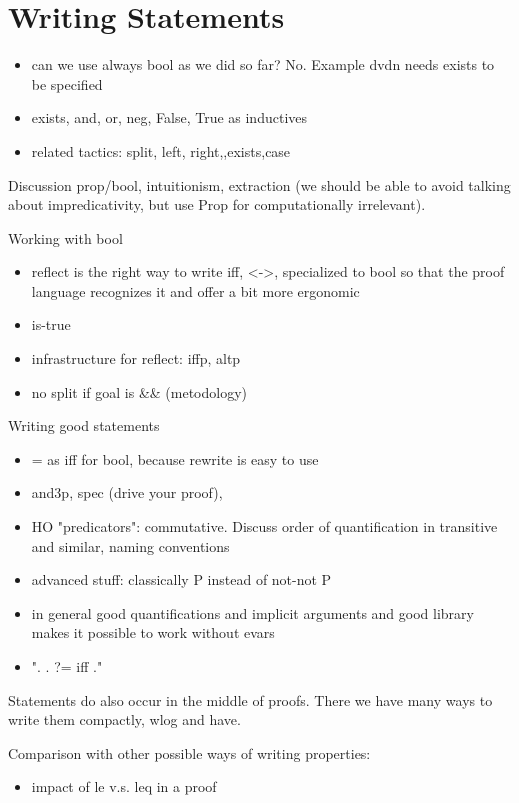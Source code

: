 \chapter{Writing Statements}

% 

\begin{itemize}
\item can we use always bool as we did so far? No. Example dvdn needs exists
        to be specified
\item exists, and, or, neg, False, True as inductives
\item related tactics: split, left, right,,exists,case
\end{itemize}

Discussion prop/bool, intuitionism, extraction (we should be able to avoid talking about impredicativity, but use Prop for computationally irrelevant).

Working with bool

\begin{itemize}
\item reflect is the right way to write iff, <->, specialized to bool
	so that the proof language recognizes it and offer a bit more ergonomic
\item is-true
\item infrastructure for reflect: iffp, altp
\item no split if goal is \&\& (metodology)
\end{itemize}

Writing good statements

\begin{itemize}
\item = as iff for bool, because rewrite is easy to use
\item and3p, spec (drive your proof), 
\item HO "predicators": commutative.  Discuss order of quantification in
	transitive and similar, naming conventions
\item advanced stuff: classically P instead of not-not P
\item in general good quantifications and implicit arguments and good library
	makes it possible to work without evars
\item ". \C{<=} . ?= iff ."
\end{itemize}

Statements do also occur in the middle of proofs.  There we have many ways to
write them compactly, wlog and have.

Comparison with other possible ways of writing properties:
\begin{itemize}
\item impact of le v.s. leq in a proof
\end{itemize}
